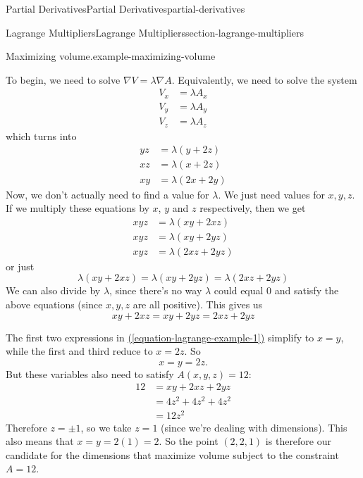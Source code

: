 \documentclass[oneside,10pt,]{book}
\numberwithin{equation}{section}
\newcommand{\grad}{\nabla}
\begin{document}
\begin{chapterptx}{Partial Derivatives}{}{Partial Derivatives}{}{}{partial-derivatives}
\begin{sectionptx}{Lagrange Multipliers}{}{Lagrange Multipliers}{}{}{section-lagrange-multipliers}
\begin{example}{Maximizing volume.}{example-maximizing-volume}
\par
\hypertarget{p-1448}{}%
To begin, we need to solve \(\grad V = \lambda \grad A\). Equivalently, we need to solve the system%
\begin{align*}
V_{x} & = \lambda A_{x} \\
V_{y} & = \lambda A_{y} \\
V_{z} & = \lambda A_{z} 
\end{align*}
which turns into%
\begin{align*}
yz & = \lambda(y + 2z) \\
xz & = \lambda(x + 2z) \\
xy & = \lambda(2x + 2y) 
\end{align*}
Now, we don't actually need to find a value for \(\lambda\). We just need values for \(x,y,z\). If we multiply these equations by \(x\), \(y\) and \(z\) respectively, then we get%
\begin{align*}
xyz & = \lambda(xy + 2xz) \\
xyz & = \lambda(xy + 2yz) \\
xyz & = \lambda(2xz + 2yz) 
\end{align*}
or just%
\begin{equation*}
\lambda(xy + 2xz) = \lambda(xy + 2yz) = \lambda(2xz + 2yz)
\end{equation*}
We can also divide by \(\lambda\), since there's no way \(\lambda\) could equal \(0\) and satisfy the above equations (since \(x,y,z\) are all positive). This gives us%
\begin{equation}
xy + 2xz = xy + 2yz = 2xz + 2yz\label{equation-lagrange-example-1}
\end{equation}
%
\par
\hypertarget{p-1449}{}%
The first two expressions in \hyperref[equation-lagrange-example-1]{(\ref{equation-lagrange-example-1})} simplify to \(x=y\), while the first and third reduce to \(x = 2z\). So%
\begin{equation*}
x = y = 2z\text{.}
\end{equation*}
But these variables also need to satisfy \(A(x,y,z) = 12\):%
\begin{align*}
12 & = xy + 2xz + 2yz \\
& = 4z^{2} + 4z^{2} + 4z^{2} \\
& = 12z^{2} 
\end{align*}
Therefore \(z = \pm1\), so we take \(z=1\) (since we're dealing with dimensions). This also means that \(x = y = 2(1) = 2\). So the point \((2,2,1)\) is therefore our candidate for the dimensions that maximize volume subject to the constraint \(A = 12\).%

\end{example}
\end{sectionptx}
\end{chapterptx}
\end{document}
